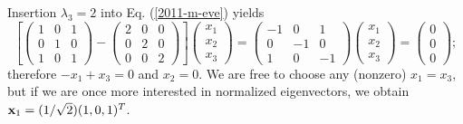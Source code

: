 {Insertion  $\lambda_3=2$ into Eq. (\ref{2011-m-eve}) yields
\begin{equation}
\left[
\left(
\begin{array}{rrrr}
1&0&1\\
0&1&0\\
1&0&1
\end{array}
\right)  -
\left(
\begin{array}{rrrr}
2&0&0\\
0&2&0\\
0&0&2
\end{array}
\right)
\right]
\left(
\begin{array}{rrrr}
x_1\\
x_2\\
x_3
\end{array}
\right)
=
\left(
\begin{array}{rrrr}
-1&0&1\\
0&-1&0\\
1&0&-1
\end{array}
\right)
\left(
\begin{array}{rrrr}
x_1\\
x_2\\
x_3
\end{array}
\right)
=
\left(
\begin{array}{rrrr}
0\\
0\\
0
\end{array}
\right)
;
\end{equation}
therefore $-x_1+x_3=0$ and $x_2=0$.
We are free to choose any (nonzero) $x_1=x_3$,
but if we are once more interested in normalized eigenvectors, we obtain
${\bf x}_1 =(1/\sqrt{2})(1,0,1)^T$.

}
